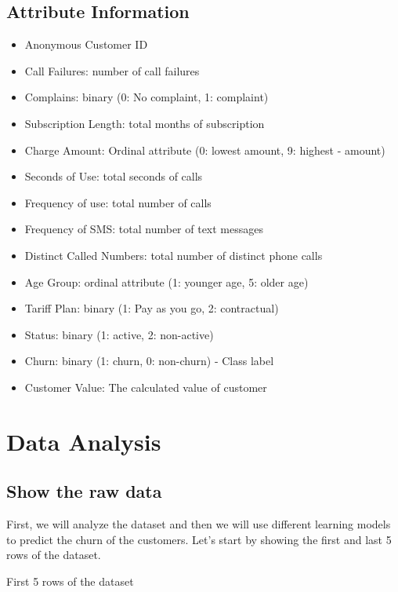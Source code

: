 \documentclass{article}
\theoremstyle{mytheoremstyle}
\theoremstyle{mytheoremstyle}
\theoremstyle{myproblemstyle}
\begin{document}
\subsection*{Attribute Information}
\begin{itemize}
  \item Anonymous Customer ID
  \item Call Failures: number of call failures
  \item Complains: binary (0: No complaint, 1: complaint)
  \item Subscription Length: total months of subscription
  \item Charge Amount: Ordinal attribute (0: lowest amount, 9: highest  - amount)
  \item Seconds of Use: total seconds of calls
  \item Frequency of use: total number of calls
  \item Frequency of SMS: total number of text messages
  \item Distinct Called Numbers: total number of distinct phone calls
  \item Age Group: ordinal attribute (1: younger age, 5: older age)
  \item Tariff Plan: binary (1: Pay as you go, 2: contractual)
  \item Status: binary (1: active, 2: non-active)
  \item Churn: binary (1: churn, 0: non-churn) - Class label
  \item Customer Value: The calculated value of customer
\end{itemize}

\section*{Data Analysis}

\subsection*{Show the raw data}
First, we will analyze the dataset and then we will use different learning models to predict the churn of the customers. Let's start by showing the first and last 5 rows of the dataset.

\begin{table}[h]
  \centering
  \caption{First 5 rows of the dataset}
\end{table}
\end{document}
